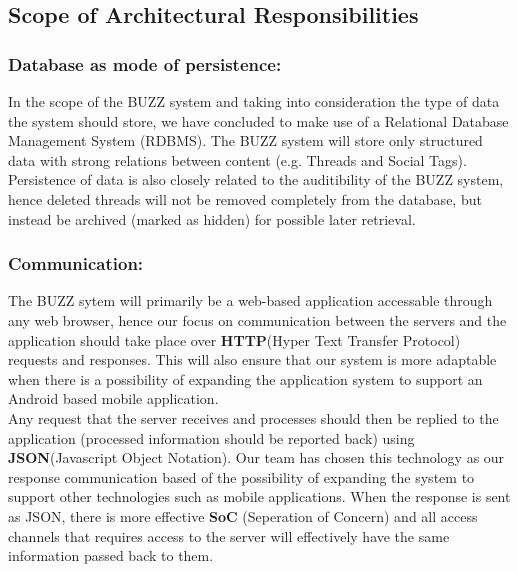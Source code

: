 
\subsection{Scope of Architectural Responsibilities}
	\subsubsection{Database as mode of persistence: }
	In the scope of the BUZZ system and taking into consideration the type of data the system should store, we have concluded to make use of a Relational Database Management System (RDBMS). The BUZZ system will store only structured data with strong relations between content (e.g. Threads and Social Tags). Persistence of data is also closely related to the auditibility of the BUZZ system, hence deleted threads will not be removed completely from the database, but instead be archived (marked as hidden) for possible later retrieval.
	
	\subsubsection{Communication:}
	The BUZZ sytem will primarily be a web-based application accessable through any web browser, hence our focus on communication between the servers and the application should take place over \textbf{HTTP}(Hyper Text Transfer Protocol) requests and responses. This will also ensure that our system is more adaptable when there is a possibility of expanding the application system to support an Android based mobile application. \\
	Any request that the server receives and processes should then be replied to the application (processed information should be reported back) using \textbf{JSON}(Javascript Object Notation). Our team has chosen this technology as our response communication based of the possibility of expanding the system to support other technologies such as mobile applications. When the response is sent as JSON, there is more effective \textbf{SoC} (Seperation of Concern) and all access channels that requires access to the server will effectively have the same information passed back to them.


